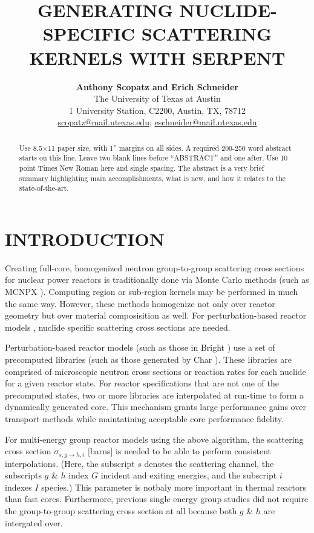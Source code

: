 \documentclass{physor2012}
\title{GENERATING NUCLIDE-SPECIFIC SCATTERING KERNELS WITH SERPENT}
\author{%
  \textbf{Anthony Scopatz and Erich Schneider} \\
  The University of Texas at Austin \\
  1 University Station, C2200, Austin, TX, 78712 \\
  \url{scopatz@mail.utexas.edu}; \url{eschneider@mail.utexas.edu} \\
}
\begin{document}
\maketitle
\begin{abstract}
  Use 8.5$\times$11 paper size, with 1'' margins on all sides.  A required 200-250 
  word abstract starts on this line.  Leave two blank lines before ``ABSTRACT''
  and one after.  Use 10 point Times New Roman here and single 
  spacing. The abstract is a very brief summary highlighting main 
  accomplishments, what is new, and how it relates to the state-of-the-art.
\end{abstract}


\section{INTRODUCTION} 
Creating full-core, homogenized neutron group-to-group scattering cross sections
for nuclear power reactors is traditionally done via Monte Carlo methods (such as
MCNPX \cite{}).  Computing region or sub-region kernels may be performed in much 
the same way.  However, these methods homogenize not only over reactor geometry
but over material composisition as well.  For perturbation-based reactor models 
\cite{}, nuclide specific scattering cross sections are needed.

Perturbation-based reactor models (such as those in Bright \cite{}) use a 
set of precomputed libraries (such as those generated by Char \cite{}).
These libraries are comprised of microscopic neutron cross sections 
or reaction rates for each nuclide for a given reactor state.  For reactor 
specifications that are not one of the precomputed states, two or more libraries
are interpolated at run-time to form a dynamically generated core.  This mechanism
grants large performance gains over transport methods while maintatining 
acceptable core performance fidelity.

For multi-energy group reactor models using the above algorithm, the scattering 
cross section $\sigma_{s,g\to h,i}$ [barns] is needed to be able to perform 
consistent interpolations. (Here, the subscript $s$ denotes the scattering channel, 
the subscripts $g$ \& $h$ index $G$ incident and exiting energies, and the subscript
$i$ indexes $I$ species.)  This parameter is notbaly more important in thermal reactors
than fast cores.  Furthermore, previous single energy group studies \cite{} did 
not require the group-to-group scattering cross section at all because both 
$g$ \& $h$ are intergated over.
\end{document}
